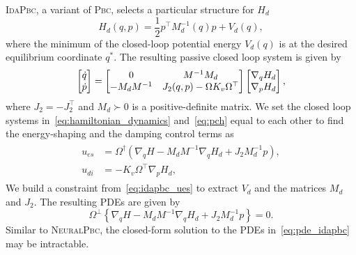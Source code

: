 \textsc{IdaPbc}, a variant of \textsc{Pbc}, selects a particular structure for
$H_d$ 
\begin{equation}
  H_d(q, p) = \frac{1}{2} p^\top M_d^{-1}(q) p + V_d(q),
  \label{eq:idapbc_desired_hamiltonian}
\end{equation}
\noindent where the minimum of the closed-loop potential energy $V_d(q)$ is at
the desired equilibrium coordinate $q^*$.
%
The resulting passive closed loop system is given by~\cite{ortega2002stabilization}
\begin{equation}
  \begin{bmatrix}\dot{q} \\ \dot{p}\end{bmatrix}  =
  \begin{bmatrix}0 & M^{-1}M_d \\ -M_dM^{-1} & J_2(q,p) - \Omega K_v \Omega^\top\end{bmatrix}
  \begin{bmatrix}\nabla_q H_d \\ \nabla_p H_d\end{bmatrix},
  \label{eq:pch}
\end{equation}
where $J_2 = -J_2^\top$ and $M_d \succ 0$ is a positive-definite matrix.
%
We set the closed loop systems in~\eqref{eq:hamiltonian_dynamics}
and~\eqref{eq:pch} equal to each other to find the energy-shaping and the damping control terms as
\begin{align}
  \begin{split}
  u_{es} &= \Omega^{\dagger} \left(\nabla_qH - M_dM^{-1} \nabla_qH_d + J_2M_d^{-1}p\right), \\
  u_{di} &= -K_v \Omega^\top \nabla_p H_d,
  \end{split}
  \label{eq:idapbc_ues}
\end{align}
%
We build a constraint from~\eqref{eq:idapbc_ues} to extract $V_d$ and the
matrices $M_d$ and $J_2$. The resulting PDEs are given by 
\begin{equation}
  \Omega^\perp \left\{ \nabla_qH - M_dM^{-1} \nabla_qH_d + J_2M_d^{-1}p \right\} = 0.
  \label{eq:pde_idapbc}
\end{equation}
%
Similar to \textsc{NeuralPbc}, the closed-form solution to the PDEs
in~\eqref{eq:pde_idapbc} may be intractable. 

